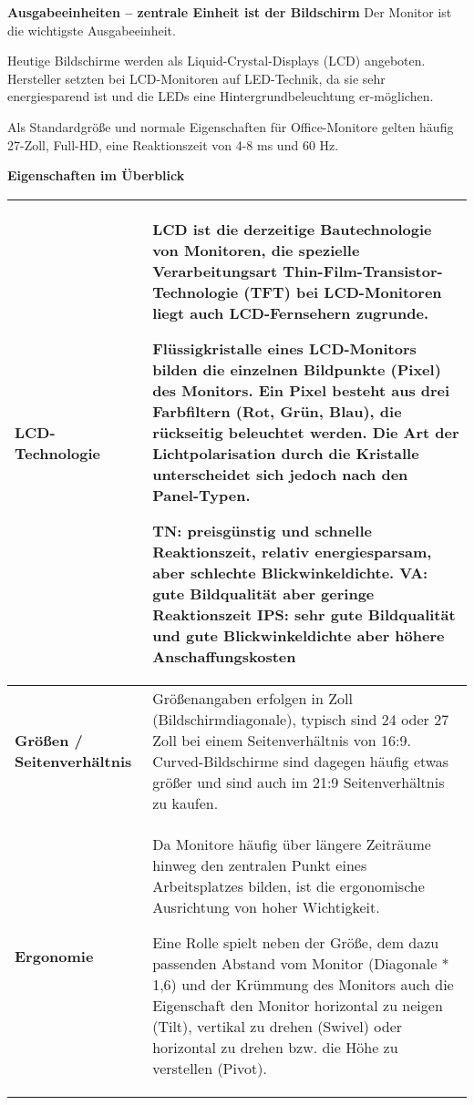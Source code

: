 \documentclass[asp1.tex]{subfiles}
\begin{document}
\textbf{Ausgabeeinheiten – zentrale Einheit ist der Bildschirm}
Der Monitor ist die wichtigste Ausgabeeinheit.

Heutige Bildschirme werden als Liquid-Crystal-Displays (LCD) angeboten. Hersteller setzten bei LCD-Monitoren auf LED-Technik, da sie sehr energiesparend ist und die LEDs eine Hintergrundbeleuchtung er-möglichen.

Als Standardgröße und normale Eigenschaften für Office-Monitore gelten häufig 27-Zoll, Full-HD, eine Reaktionszeit von 4-8 ms und 60 Hz.

\textbf{Eigenschaften im Überblick}
\begin{longtable}{|p{}|p{}|}
    \hline
    \textbf{LCD-Technologie}           &
    LCD ist die derzeitige Bautechnologie von Monitoren, die spezielle Verarbeitungsart Thin-Film-Transistor-Technologie (TFT) bei LCD-Monitoren liegt auch LCD-Fernsehern zugrunde.

    Flüssigkristalle eines LCD-Monitors bilden die einzelnen Bildpunkte (Pixel) des Monitors. Ein Pixel besteht aus drei Farbfiltern (Rot, Grün, Blau), die rückseitig beleuchtet werden. Die Art der Lichtpolarisation durch die Kristalle unterscheidet sich jedoch nach den Panel-Typen.
    \begin{outline}
        \1 TN: preisgünstig und schnelle Reaktionszeit, relativ energiesparsam, aber schlechte Blickwinkeldichte.
        \1 VA: gute Bildqualität aber geringe Reaktionszeit
        \1 IPS: sehr gute Bildqualität und gute Blickwinkeldichte aber höhere Anschaffungskosten
    \end{outline}
    \\\hline

    \textbf{Größen / Seitenverhältnis} &
    Größenangaben erfolgen in Zoll (Bildschirmdiagonale), typisch sind 24 oder 27 Zoll bei einem Seitenverhältnis von 16:9. Curved-Bildschirme sind dagegen häufig etwas größer und sind auch im 21:9 Seitenverhältnis zu kaufen.
    \\\hline

    \textbf{Ergonomie}                 &
    Da Monitore häufig über längere Zeiträume hinweg den zentralen Punkt eines Arbeitsplatzes bilden, ist die ergonomische Ausrichtung von hoher Wichtigkeit.

    Eine Rolle spielt neben der Größe, dem dazu passenden Abstand vom Monitor (Diagonale * 1,6) und der Krümmung des Monitors auch die Eigenschaft den Monitor horizontal zu neigen (Tilt), vertikal zu drehen (Swivel) oder horizontal zu drehen bzw. die Höhe zu verstellen (Pivot).


\end{longtable}
\end{document}
